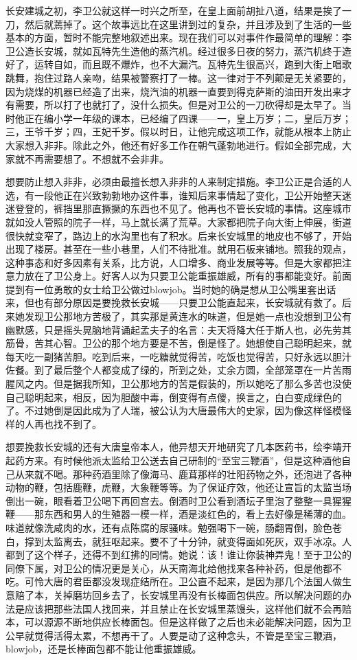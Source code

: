长安建城之初，李卫公就这样一时兴之所至，在皇上面前胡扯八道，结果是挨了一刀，然后就蔫掉了。这个故事远比在这里讲到过的复杂，并且涉及到了生活的一些基本的方面，暂时不能完整地叙述出来。现在我们可以对事件作最简单的理解：李卫公造长安城，就如瓦特先生造他的蒸汽机。经过很多日夜的努力，蒸汽机终于造好了，运转自如，而且既不爆炸，也不大漏汽。瓦特先生很高兴，跑到大街上唱歌跳舞，抱住过路人亲吻，结果被警察打了一棒。这一律对于不列颠是无关紧要的，因为烧煤的机器已经造了出来，烧汽油的机器一直要到得克萨斯的油田开发出来才有需要，所以打了也就打了，没什么损失。但是对卫公的一刀砍得却是太早了。当时他正在编小学一年级的课本，已经编了四课——一，皇上万岁；二，皇后万岁；三，王爷千岁；四，王妃千岁。假以时日，让他完成这项工作，就能从根本上防止大家想入非非。除此之外，他还有好多工作在朝气蓬勃地进行。假如全部完成，大家就不再需要想了。不想就不会非非。 

想要防止想入非非，必须由最擅长想入非非的人来制定措施。李卫公正是合适的人选，有一段他正在兴致勃勃地办这件事，谁知后来事情起了变化，卫公开始整天迷迷登登的，裤挡里那直撅撅的东西也不见了。他再也不管长安城的事情。这座城市就如没人管照的院子一样，马上就长满了荒草。大家都把院子向大街上伸展，街道很快就变窄了，路边上的水沟里也有了积水。后来长安城里的地皮也不够了，开始出现了楼房。甚至在一些小巷里，人们不待批准。就用石板来铺地。照我的观点，这种事态和好多因素有关系，比方说，人口增多、商业发展等等。但是大家都把注意力放在了卫公身上。好客人以为只要卫公能重振雄威，所有的事都能变好。前面提到有一位勇敢的女士给卫公做过blowjob。当时她的确是想从卫公嘴里套出话来，但也有部分原因是要挽救长安城——只要卫公能直起来，长安城就有救了。后来她发现卫公那地方苦极了，其实那是黄连水的味道，但是她一点也没想到卫公有幽默感，只是摇头晃脑地背诵起孟夫子的名言：夫天将降大任于斯人也，必先劳其筋骨，苦其心智。卫公的那个地方要是不苦，倒是怪了。她想使自己聪明起来，就每天吃一副猪苦胆。吃到后来，一吃糖就觉得苦，吃饭也觉得苦，只好永远以胆汁佐餐。到了最后整个人都变成了绿的，所到之处，丈余方圆，全部笼罩在一片苦雨腥风之内。但是据我所知，卫公那地方的苦是假装的，所以她吃了那么多苦也没使自己聪明起来，相反，因为胆酸中毒，倒变得有点傻，换言之，白白变成绿色的了。不过她倒是因此成为了人瑞，被公认为大唐最伟大的史家，因为像这样怪模怪样的人再也找不到了。 

想要挽救长安城的还有大唐皇帝本人，他异想天开地研究了几本医药书，绘李靖开起药方来。有时候他派太监给卫公送去自己研制的“至宝三鞭酒”，但是这种酒他自己从来就不喝。那种药酒里除了像海马、鹿茸那样的壮阳药物之外，还泡进了各种动物的鞭，包括鹿鞭，虎鞭，大象鞭等等。为了保证疗效，他还让宣旨的太监当场倒出一碗，眼看着卫公喝下再回宫去。倒酒时卫公看到酒坛子里泡了整整一具猩猩鞭——那东西和男人的生殖器一模一样，酒是淡红色的，看上去好像是稀薄的血。味道就像洗咸肉的水，还有点陈腐的尿骚味。勉强喝下一碗，肠翻胃倒，脸色苍白，撑到太监离去，就狂呕起来。要不了十分钟，就变得面如死灰，双手冰凉。人都到了这个样子，还得不到红拂的同情。她说：该！谁让你装神弄鬼！至于卫公的同僚下属，对卫公的情况更是关心，从天南海北给他找来各种补药，但是他都不吃。可怜大唐的君臣都没发现症结所在。卫公直不起来，是因为那几个法国人做生意赔了本，关掉磨坊回乡去了，长安城里再没有长棒面包供应。所以解决问题的办法是应该把那些法国人找回来，并且禁止在长安城里蒸馒头，这样他们就不会再赔本，可以源源不断地供应长棒面包。但是这样做了之后也未必能解决问题，因为卫公早就觉得活得太累，不想再干了。人要是动了这种念头，不管是至宝三鞭酒，blowjob，还是长棒面包都不能让他重振雄威。 

